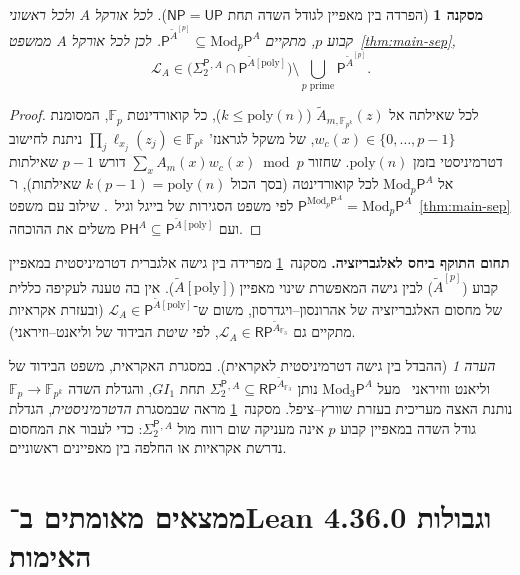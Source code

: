 \documentclass[11pt,a4paper]{article}
\newtheorem{corollary}[theorem]{מסקנה}
\theoremstyle{definition}
\theoremstyle{remark}
\newtheorem{remark}[theorem]{הערה}
\newcommand{\Pcl}{\mathsf{P}}
\newcommand{\NP}{\mathsf{NP}}
\newcommand{\UP}{\mathsf{UP}}
\newcommand{\PH}{\mathsf{PH}}
\newcommand{\RP}{\mathsf{RP}}
\newcommand{\Modp}{\mathrm{Mod}_p\mathsf{P}}
\newcommand{\Modthree}{\mathrm{Mod}_3\mathsf{P}}
\newcommand{\SigTwo}{\Sigma_2^{\mathsf{P}}}
\newcommand{\F}{\mathbb{F}}
\newcommand{\GI}{GI_1}
\newcommand{\EN}[1]{\textenglish{#1}}
\begin{document}
\begin{corollary}[הפרדה בין מאפיין לגודל השדה תחת $\NP = \UP$]
\label{cor:char-sep}
לכל אורקל $A$ ולכל ראשוני קבוע $p$, מתקיים $\Pcl^{\widetilde{A}^{[p]}} \subseteq \Modp^A$. לכן לכל אורקל $A$ ממשפט~\ref{thm:main-sep},
\[
  \mathcal{L}_A \in \bigl(\SigTwo{}^{,A} \cap \Pcl^{\widetilde{A}[\mathrm{poly}]}\bigr)
  \setminus \bigcup_{p\text{ prime}} \Pcl^{\widetilde{A}^{[p]}}.
\]
\end{corollary}

\begin{proof}
לכל שאילתה אל $\widetilde{A}_{m,\F_{p^k}}(z)$ ($k \le \mathrm{poly}(n)$), כל קואורדינטת $\F_p$, המסומנת $w_c(x) \in \{0,\dots,p-1\}$, של משקל לגראנז' $\prod_j \ell_{x_j}(z_j) \in \F_{p^k}$ ניתנת לחישוב דטרמיניסטי בזמן $\mathrm{poly}(n)$. שחזור $\sum_x A_m(x) w_c(x) \bmod p$ דורש $p - 1$ שאילתות אל $\Modp^A$ לכל קואורדינטה (בסך הכול $k(p-1) = \mathrm{poly}(n)$ שאילתות), ו־$\Pcl^{\Modp^A} = \Modp^A$ לפי משפט הסגירות של בייגל וגיל~\cite{BeigelGill1992}. שילוב עם משפט~\ref{thm:main-sep} ועם $\PH^A \subseteq \Pcl^{\widetilde{A}[\mathrm{poly}]}$ משלים את ההוכחה.
\end{proof}

\textbf{תחום התוקף ביחס לאלגבריזציה.} מסקנה~\ref{cor:char-sep} מפרידה בין גישה אלגברית דטרמיניסטית במאפיין קבוע ($\widetilde{A}^{[p]}$) לבין גישה המאפשרת שינוי מאפיין ($\widetilde{A}[\mathrm{poly}]$). אין בה טענה לעקיפה כללית של מחסום האלגבריזציה של אהרונסון–ויגדרסון, משום ש־$\mathcal{L}_A \in \Pcl^{\widetilde{A}[\mathrm{poly}]}$ (ובעזרת אקראיות מתקיים גם $\mathcal{L}_A \in \mathsf{RP}^{\widetilde{A}_{\F_3}}$, לפי שיטת הבידוד של וליאנט–וזיראני).

\begin{remark}[ההבדל בין גישה דטרמיניסטית לאקראית]
במסגרת האקראית, משפט הבידוד של וליאנט ווזיראני~\cite{ValiantVazirani1986} מעל $\Modthree^A$ נותן $\SigTwo{}^{,A} \subseteq \RP^{\widetilde{A}_{\F_3}}$ תחת $\GI$, והגדלת השדה $\F_p \to \F_{p^k}$ נותנת האצה מעריכית בעזרת שוורץ–ציפל. מסקנה~\ref{cor:char-sep} מראה שבמסגרת \emph{הדטרמיניסטית}, הגדלת גודל השדה במאפיין קבוע $p$ אינה מעניקה שום רווח מול $\SigTwo{}^{,A}$: כדי לעבור את המחסום נדרשת אקראיות או החלפה בין מאפיינים ראשוניים.
\end{remark}

\appendix
\section{ממצאים מאומתים ב־\EN{Lean 4.36.0} וגבולות האימות}
\end{document}
